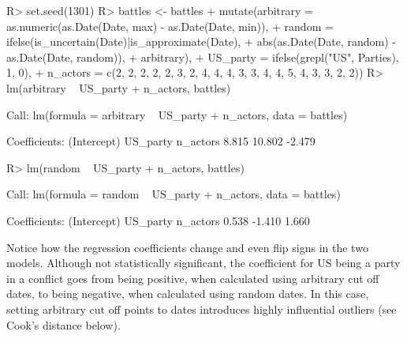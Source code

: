 \documentclass[
]{jss}
\begin{document}
\begin{CodeChunk}
\begin{CodeInput}
R> set.seed(1301)
R> battles <- battles %
+   mutate(arbitrary = as.numeric(as.Date(Date, max) - as.Date(Date, min)),
+          random = ifelse(is_uncertain(Date)|is_approximate(Date),
+                          abs(as.Date(Date, random) - as.Date(Date, random)),
+                          arbitrary),
+          US_party = ifelse(grepl("US", Parties), 1, 0),
+          n_actors = c(2, 2, 2, 2, 2, 3, 2, 4, 4, 4, 3, 3, 4, 4, 5, 4, 3, 3, 2, 2))
R> lm(arbitrary ~ US_party + n_actors, battles)
\end{CodeInput}
\begin{CodeOutput}

Call:
lm(formula = arbitrary ~ US_party + n_actors, data = battles)

Coefficients:
(Intercept)     US_party     n_actors  
      8.815       10.802       -2.479  
\end{CodeOutput}
\begin{CodeInput}
R> lm(random ~ US_party + n_actors, battles)
\end{CodeInput}
\begin{CodeOutput}

Call:
lm(formula = random ~ US_party + n_actors, data = battles)

Coefficients:
(Intercept)     US_party     n_actors  
      0.538       -1.410        1.660  
\end{CodeOutput}
\end{CodeChunk}

Notice how the regression coefficients change and even flip signs in the
two models. Although not statistically significant, the coefficient for
US being a party in a conflict goes from being positive, when calculated
using arbitrary cut off dates, to being negative, when calculated using
random dates. In this case, setting arbitrary cut off points to dates
introduces highly influential outliers (see Cook's distance below).
\end{document}
